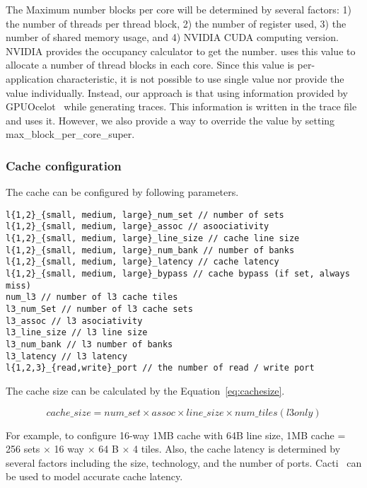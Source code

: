The Maximum number blocks per core will be determined by several
factors: 1) the number of threads per thread block, 2) the number of
register used, 3) the number of shared memory usage, and 4) NVIDIA
CUDA computing version. NVIDIA provides the occupancy calculator to
get the number. \SIM uses this value to allocate a number of thread
blocks in each core. Since this value is per-application
characteristic, it is not possible to use single value nor provide the
value individually. Instead, our approach is that using information
provided by GPUOcelot~\cite{ocelot} while generating traces. This
information is written in the trace file and \SIM uses it. However, we
also provide a way to override the value by
setting \textsf{max\_block\_per\_core\_super}.



\subsubsection{Cache configuration}

The cache can be configured by following parameters.

\smallskip
\begin{lstlisting}
l{1,2}_{small, medium, large}_num_set // number of sets
l{1,2}_{small, medium, large}_assoc // asoociativity
l{1,2}_{small, medium, large}_line_size // cache line size
l{1,2}_{small, medium, large}_num_bank // number of banks  
l{1,2}_{small, medium, large}_latency // cache latency
l{1,2}_{small, medium, large}_bypass // cache bypass (if set, always miss)
num_l3 // number of l3 cache tiles
l3_num_Set // number of l3 cache sets
l3_assoc // l3 asociativity
l3_line_size // l3 line size
l3_num_bank // l3 number of banks
l3_latency // l3 latency
l{1,2,3}_{read,write}_port // the number of read / write port
\end{lstlisting}
\smallskip

The cache size can be calculated by the Equation~\ref{eq:cachesize}.

\begin{equation}
\label{eq:cachesize}
cache\_size = num\_set \times assoc \times line\_size \times num\_tiles (l3 only)
\end{equation}

For example, to configure 16-way 1MB cache with 64B line
size, \textsf{1MB cache} = \textsf{256 sets} $\times$ \textsf{16 way}
$\times$ \textsf{64 B} $\times$ \textsf{4 tiles}. Also, the cache
latency is determined by several factors including the size,
technology, and the number of ports. Cacti~\cite{cacti} can be used to
model accurate cache latency.



